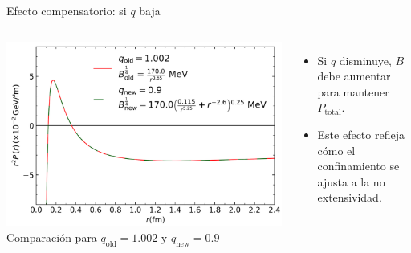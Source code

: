 \documentclass{beamer}
\begin{document}
\begin{frame}{Efecto compensatorio: si \( q \) baja}
  \begin{columns}
    \includegraphics[width=\linewidth]{figures/If-q-down.png}
    \vspace{0.1cm}
    \centering \scriptsize{Comparación para \( q_{\text{old}} = 1.002 \) y \( q_{\text{new}} = 0.9 \)}

    \begin{itemize}
      \item Si \( q \) disminuye, \( B \) debe aumentar para mantener \( P_{\text{total}} \).
      \item Este efecto refleja cómo el confinamiento se ajusta a la no extensividad.
    \end{itemize}
  \end{columns}
\end{frame}
\end{document}

